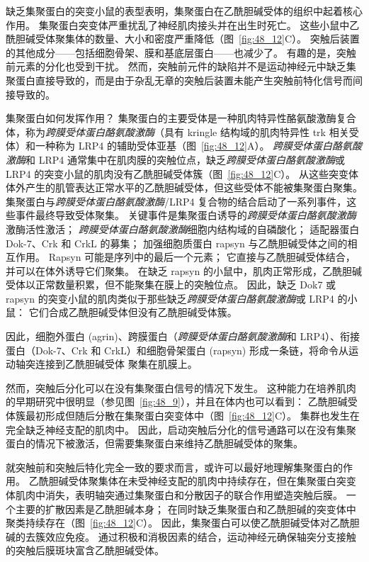 缺乏集聚蛋白的突变小鼠的表型表明，集聚蛋白在乙酰胆碱受体的组织中起着核心作用。
集聚蛋白突变体严重扰乱了神经肌肉接头并在出生时死亡。
这些小鼠中乙酰胆碱受体聚集体的数量、大小和密度严重降低（图~\ref{fig:48_12}C）。
突触后装置的其他成分——包括细胞骨架、膜和基底层蛋白——也减少了。
有趣的是，突触前元素的分化也受到干扰。
然而，突触前元件的缺陷并不是运动神经元中缺乏集聚蛋白直接导致的，而是由于杂乱无章的突触后装置未能产生突触前特化信号而间接导致的。


集聚蛋白如何发挥作用？
集聚蛋白的主要受体是一种肌肉特异性酪氨酸激酶复合体，称为\textit{跨膜受体蛋白酪氨酸激酶}（具有 kringle 结构域的肌肉特异性 trk 相关受体）和一种称为 LRP4 的辅助受体亚基（图~\ref{fig:48_12}A）。
\textit{跨膜受体蛋白酪氨酸激酶}和 LRP4 通常集中在肌肉膜的突触位点，缺乏\textit{跨膜受体蛋白酪氨酸激酶}或 LRP4 的突变小鼠的肌肉没有乙酰胆碱受体簇（图~\ref{fig:48_12}C）。
从这些突变体体外产生的肌管表达正常水平的乙酰胆碱受体，但这些受体不能被集聚蛋白聚集。
集聚蛋白与\textit{跨膜受体蛋白酪氨酸激酶}/LRP4 复合物的结合启动了一系列事件，这些事件最终导致受体聚集。
关键事件是集聚蛋白诱导的\textit{跨膜受体蛋白酪氨酸激酶}激酶活性激活；
\textit{跨膜受体蛋白酪氨酸激酶}细胞内结构域的自磷酸化；
适配器蛋白 Dok-7、Crk 和 CrkL 的募集；
加强细胞质蛋白 rapsyn 与乙酰胆碱受体之间的相互作用。
Rapsyn 可能是序列中的最后一个元素；
它直接与乙酰胆碱受体结合，并可以在体外诱导它们聚集。
在缺乏 rapsyn 的小鼠中，肌肉正常形成，乙酰胆碱受体以正常数量积累，但不能聚集在膜上的突触位点。
因此，缺乏 Dok7 或 rapsyn 的突变小鼠的肌肉类似于那些缺乏\textit{跨膜受体蛋白酪氨酸激酶}或 LRP4 的小鼠：
它们合成乙酰胆碱受体但没有乙酰胆碱受体簇。


因此，细胞外蛋白 (agrin)、跨膜蛋白（\textit{跨膜受体蛋白酪氨酸激酶}和 LRP4）、衔接蛋白（Dok-7、Crk 和 CrkL）和细胞骨架蛋白 (rapsyn) 形成一条链，将命令从运动轴突连接到乙酰胆碱受体 聚集在肌膜上。


然而，突触后分化可以在没有集聚蛋白信号的情况下发生。
这种能力在培养肌肉的早期研究中很明显（参见图~\ref{fig:48_9}），并且在体内也可以看到：
乙酰胆碱受体簇最初形成但随后分散在集聚蛋白突变体中（图~\ref{fig:48_12}C）。
集群也发生在完全缺乏神经支配的肌肉中。
因此，启动突触后分化的信号通路可以在没有集聚蛋白的情况下被激活，但需要集聚蛋白来维持乙酰胆碱受体的聚集。


就突触前和突触后特化完全一致的要求而言，或许可以最好地理解集聚蛋白的作用。
乙酰胆碱受体聚集体在未受神经支配的肌肉中持续存在，但在集聚蛋白突变体肌肉中消失，表明轴突通过集聚蛋白和分散因子的联合作用塑造突触后膜。
一个主要的扩散因素是乙酰胆碱本身；
在同时缺乏集聚蛋白和乙酰胆碱的突变体中聚类持续存在（图~\ref{fig:48_12}C）。
因此，集聚蛋白可以使乙酰胆碱受体对乙酰胆碱的去簇效应免疫。
通过积极和消极因素的结合，运动神经元确保轴突分支接触的突触后膜斑块富含乙酰胆碱受体。




